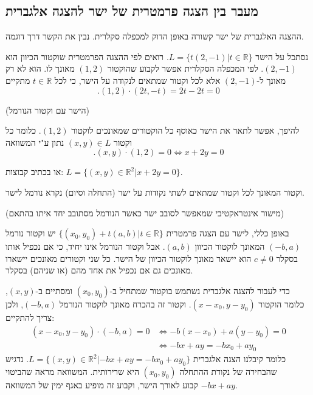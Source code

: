 \documentclass[
  hebrew,
  12pt,
  a4paper,
  oneside]{book}
\theoremstyle{definition}
\theoremstyle{remark}
\theoremstyle{plain}
\theoremstyle{remark}
\begin{document}
\subsection{מעבר בין הצגה פרמטרית של ישר להצגה
אלגברית}\label{ux5deux5e2ux5d1ux5e8-ux5d1ux5d9ux5df-ux5d4ux5e6ux5d2ux5d4-ux5e4ux5e8ux5deux5d8ux5e8ux5d9ux5ea-ux5e9ux5dc-ux5d9ux5e9ux5e8-ux5dcux5d4ux5e6ux5d2ux5d4-ux5d0ux5dcux5d2ux5d1ux5e8ux5d9ux5ea}

ההצגה האלגברית של ישר קשורה באופן הדוק למכפלה סקלרית. נבין את הקשר דרך
דוגמה.

\begin{example}

נסתכל על הישר \(L=\{t(2,-1)|t\in\mathbb{R}\}\). רואים לפי ההצגה הפרמטרית
שוקטור הכיוון הוא \((2,-1)\). לפי המכפלה הסקלרית אפשר לקבוע שהוקטור
\((1,2)\) מאונך לו. הוא לא רק מאונך ל-\((2,-1)\) אלא לכל וקטור שמתאים
לנקודה על הישר, כי לכל \(t\in\mathbb{R}\) מתקיים
\[.(1,2)\cdot(2t,-t)=2t-2t=0\]

\end{example}

(הישר עם וקטור הנורמל)

להיפך, אפשר לתאר את הישר כאוסף כל הוקטורים שמאונכים לוקטור \((1,2)\).
כלומר כל וקטור \((x,y)\in L\) נתון ע"י המשוואה
\[.(x,y)\cdot(1,2)=0\iff x+2y=0\]

או בכתיב קבוצות: \(L=\{(x,y)\in\mathbb{R}^{2}|x+2y=0\}\).

\begin{definition}

וקטור המאונך לכל וקטור שמתאים לשתי נקודות על ישר (התחלה וסיום) נקרא
נורמל לישר.

\end{definition}

(מישור אינטראקטיבי שמאפשר לסובב ישר כאשר הנורמל מסתובב יחד איתו בהתאם)

באופן כללי, לישר עם הצגה פרמטרית
\(\{(x_{0},y_{0})+t(a,b)|t\in\mathbb{R}\}\) יש וקטור נורמל \((-b,a)\)
המאונך לוקטור הכיוון \((a,b)\). אבל וקטור הנורמל אינו יחיד, כי אם נכפיל
אותו בסקלר \(c\neq0\) הוא יישאר מאונך לוקטור הכיוון של הישר. כל שני
וקטורים מאונכים יישארו מאונכים גם אם נכפיל את אחד מהם (או שניהם) בסקלר.

כדי לעבור להצגה אלגברית נשתמש בוקטור שמתחיל ב-\((x_{0},y_{0})\) ומסתיים
ב-\((x,y)\), כלומר הוקטור \((x-x_{0},y-y_{0})\). וקטור זה בהכרח מאונך
לוקטור הנורמל \((-b,a)\), ולכן צריך להתקיים: \[\begin{aligned}
    (x-x_{0},y-y_{0})\cdot(-b,a)=0&\iff-b(x-x_{0})+a(y-y_{0})=0\\
    &\iff-bx+ay=-bx_{0}+ay_{0}
\end{aligned}\] כלומר קיבלנו הצגה אלגברית
\(L=\{(x,y)\in\mathbb{R}^{2}|-bx+ay=-bx_{0}+ay_{0}\}\). נדגיש שהבחירה של
נקודת ההתחלה \((x_{0},y_{0})\) היא שרירותית. המשוואה מראה שהביטוי
\(-bx+ay\) קבוע לאורך הישר, וקבוע זה מופיע באגף ימין של המשוואה.
\end{document}
